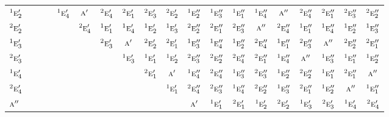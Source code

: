 \documentclass[10pt,a4paper]{article}
\numberwithin{equation}{section}
\newcommand{\irr}[1]{\text{\normalfont\scshape #1}}
\newcommand{\conjpair}[1]{{}^{#1}}
\begin{document}
{\begin{longtable}{@{}lcccccccccccccccccc@{}}
$\conjpair{1}\irr{e}_{2}'$ &  &  &  & $\conjpair{1}\irr{e}_{4}'$ & $\irr{a}'$ & $\conjpair{2}\irr{e}_{4}'$ & $\conjpair{2}\irr{e}_{1}'$ & $\conjpair{2}\irr{e}_{3}'$ & $\conjpair{2}\irr{e}_{2}'$ & $\conjpair{1}\irr{e}_{2}''$ & $\conjpair{1}\irr{e}_{3}''$ & $\conjpair{1}\irr{e}_{1}''$ & $\conjpair{1}\irr{e}_{4}''$ & $\irr{a}''$ & $\conjpair{2}\irr{e}_{4}''$ & $\conjpair{2}\irr{e}_{1}''$ & $\conjpair{2}\irr{e}_{3}''$ & $\conjpair{2}\irr{e}_{2}''$\\
$\conjpair{2}\irr{e}_{2}'$ &  &  &  &  & $\conjpair{2}\irr{e}_{4}'$ & $\conjpair{1}\irr{e}_{1}'$ & $\conjpair{1}\irr{e}_{4}'$ & $\conjpair{1}\irr{e}_{2}'$ & $\conjpair{1}\irr{e}_{3}'$ & $\conjpair{2}\irr{e}_{2}''$ & $\conjpair{2}\irr{e}_{1}''$ & $\conjpair{2}\irr{e}_{3}''$ & $\irr{a}''$ & $\conjpair{2}\irr{e}_{4}''$ & $\conjpair{1}\irr{e}_{1}''$ & $\conjpair{1}\irr{e}_{4}''$ & $\conjpair{1}\irr{e}_{2}''$ & $\conjpair{1}\irr{e}_{3}''$\\
$\conjpair{1}\irr{e}_{3}'$ &  &  &  &  &  & $\conjpair{2}\irr{e}_{3}'$ & $\irr{a}'$ & $\conjpair{2}\irr{e}_{2}'$ & $\conjpair{2}\irr{e}_{1}'$ & $\conjpair{1}\irr{e}_{3}''$ & $\conjpair{1}\irr{e}_{4}''$ & $\conjpair{1}\irr{e}_{2}''$ & $\conjpair{2}\irr{e}_{4}''$ & $\conjpair{1}\irr{e}_{1}''$ & $\conjpair{2}\irr{e}_{3}''$ & $\irr{a}''$ & $\conjpair{2}\irr{e}_{2}''$ & $\conjpair{2}\irr{e}_{1}''$\\
$\conjpair{2}\irr{e}_{3}'$ &  &  &  &  &  &  & $\conjpair{1}\irr{e}_{3}'$ & $\conjpair{1}\irr{e}_{1}'$ & $\conjpair{1}\irr{e}_{2}'$ & $\conjpair{2}\irr{e}_{3}''$ & $\conjpair{2}\irr{e}_{2}''$ & $\conjpair{2}\irr{e}_{4}''$ & $\conjpair{2}\irr{e}_{1}''$ & $\conjpair{1}\irr{e}_{4}''$ & $\irr{a}''$ & $\conjpair{1}\irr{e}_{3}''$ & $\conjpair{1}\irr{e}_{1}''$ & $\conjpair{1}\irr{e}_{2}''$\\
$\conjpair{1}\irr{e}_{4}'$ &  &  &  &  &  &  &  & $\conjpair{2}\irr{e}_{1}'$ & $\irr{a}'$ & $\conjpair{1}\irr{e}_{4}''$ & $\conjpair{2}\irr{e}_{4}''$ & $\conjpair{1}\irr{e}_{3}''$ & $\conjpair{2}\irr{e}_{3}''$ & $\conjpair{1}\irr{e}_{2}''$ & $\conjpair{2}\irr{e}_{2}''$ & $\conjpair{1}\irr{e}_{1}''$ & $\conjpair{2}\irr{e}_{1}''$ & $\irr{a}''$\\
$\conjpair{2}\irr{e}_{4}'$ &  &  &  &  &  &  &  &  & $\conjpair{1}\irr{e}_{1}'$ & $\conjpair{2}\irr{e}_{4}''$ & $\conjpair{2}\irr{e}_{3}''$ & $\conjpair{1}\irr{e}_{4}''$ & $\conjpair{2}\irr{e}_{2}''$ & $\conjpair{1}\irr{e}_{3}''$ & $\conjpair{2}\irr{e}_{1}''$ & $\conjpair{1}\irr{e}_{2}''$ & $\irr{a}''$ & $\conjpair{1}\irr{e}_{1}''$\\
$\irr{a}''$ &  &  &  &  &  &  &  &  &  & $\irr{a}'$ & $\conjpair{1}\irr{e}_{1}'$ & $\conjpair{2}\irr{e}_{1}'$ & $\conjpair{1}\irr{e}_{2}'$ & $\conjpair{2}\irr{e}_{2}'$ & $\conjpair{1}\irr{e}_{3}'$ & $\conjpair{2}\irr{e}_{3}'$ & $\conjpair{1}\irr{e}_{4}'$ & $\conjpair{2}\irr{e}_{4}'$\\

\end{longtable}}
\end{document}
